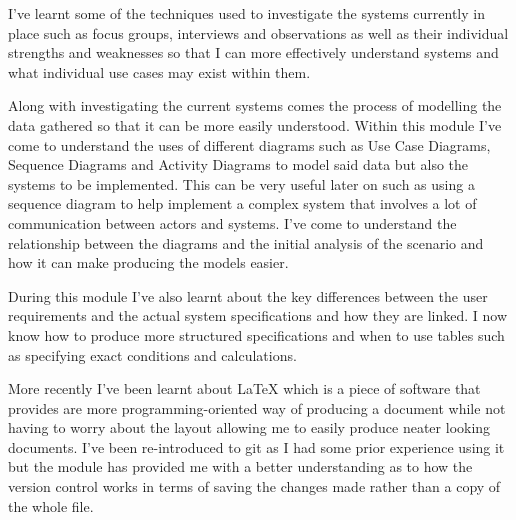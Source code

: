 I've learnt some of the techniques used to investigate the systems currently in place such as focus groups, interviews and observations as well as their individual strengths and weaknesses so that I can more effectively understand systems and what individual use cases may exist within them.

Along with investigating the current systems comes the process of modelling the data gathered so that it can be more easily understood. Within this module I've come to understand the uses of different diagrams such as Use Case Diagrams, Sequence Diagrams and Activity Diagrams to model said data but also the systems to be implemented. This can be very useful later on such as using a sequence diagram to help implement a complex system that involves a lot of communication between actors and systems. I've come to understand the relationship between the diagrams and the initial analysis of the scenario and how it can make producing the models easier.

During this module I've also learnt about the key differences between the user requirements and the actual system specifications and how they are linked. I now know how to produce more structured specifications and when to use tables such as specifying exact conditions and calculations.

More recently I've been learnt about LaTeX which is a piece of software that provides are more programming-oriented way of producing a document while not having to worry about the layout allowing me to easily produce neater looking documents. I've been re-introduced to git as I had some prior experience using it but the module has provided me with a better understanding as to how the version control works in terms of saving the changes made rather than a copy of the whole file.

